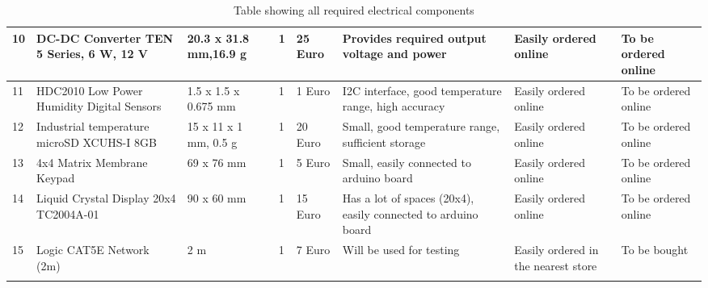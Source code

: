 \begin{longtable}{|m{}|m{}|m{}|m{}|m{}|m{}|m{}|m{}|}
10 & DC-DC Converter TEN 5 Series, 6 W, 12 V & 20.3 x 31.8 mm,16.9 g & 1 & 25 Euro & Provides required output voltage and power & Easily ordered online & To be ordered online \\ \hline
11 & HDC2010 Low Power Humidity Digital Sensors & 1.5 x 1.5 x 0.675 mm & 1 & 1 Euro & I2C interface, good temperature range, high accuracy & Easily ordered online & To be ordered online \\ \hline
12 & Industrial temperature microSD XCUHS-I 8GB & 15 x 11 x 1 mm, 0.5 g & 1 & 20 Euro & Small, good temperature range, sufficient storage & Easily ordered online & To be ordered online \\ \hline
13 & 4x4 Matrix Membrane Keypad & 69 x 76 mm & 1 & 5 Euro & Small, easily connected to arduino board & Easily ordered online & To be ordered online \\ \hline
14 & Liquid Crystal Display 20x4 TC2004A-01 & 90 x 60 mm & 1 & 15 Euro & Has a lot of spaces (20x4), easily connected to arduino board & Easily ordered online & To be ordered online \\ \hline
15 & Logic CAT5E Network (2m) & 2 m & 1 & 7 Euro & Will be used for testing & Easily ordered in the nearest store & To be bought \\ \hline


    \caption{Table showing all required electrical components}
    \label{tab:electrical-components}
\end{longtable}
\raggedbottom